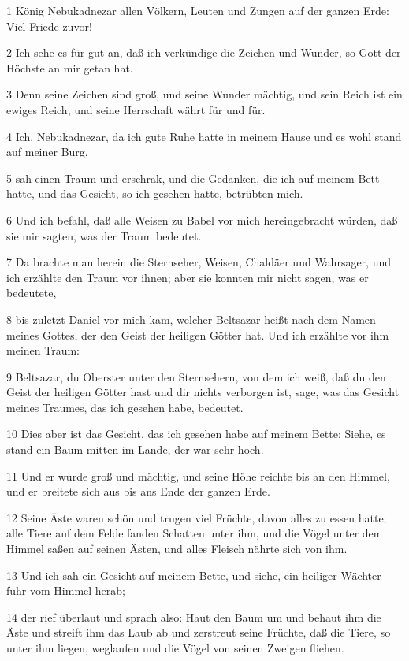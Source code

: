 \par 1 König Nebukadnezar allen Völkern, Leuten und Zungen auf der ganzen Erde: Viel Friede zuvor!
\par 2 Ich sehe es für gut an, daß ich verkündige die Zeichen und Wunder, so Gott der Höchste an mir getan hat.
\par 3 Denn seine Zeichen sind groß, und seine Wunder mächtig, und sein Reich ist ein ewiges Reich, und seine Herrschaft währt für und für.
\par 4 Ich, Nebukadnezar, da ich gute Ruhe hatte in meinem Hause und es wohl stand auf meiner Burg,
\par 5 sah einen Traum und erschrak, und die Gedanken, die ich auf meinem Bett hatte, und das Gesicht, so ich gesehen hatte, betrübten mich.
\par 6 Und ich befahl, daß alle Weisen zu Babel vor mich hereingebracht würden, daß sie mir sagten, was der Traum bedeutet.
\par 7 Da brachte man herein die Sternseher, Weisen, Chaldäer und Wahrsager, und ich erzählte den Traum vor ihnen; aber sie konnten mir nicht sagen, was er bedeutete,
\par 8 bis zuletzt Daniel vor mich kam, welcher Beltsazar heißt nach dem Namen meines Gottes, der den Geist der heiligen Götter hat. Und ich erzählte vor ihm meinen Traum:
\par 9 Beltsazar, du Oberster unter den Sternsehern, von dem ich weiß, daß du den Geist der heiligen Götter hast und dir nichts verborgen ist, sage, was das Gesicht meines Traumes, das ich gesehen habe, bedeutet.
\par 10 Dies aber ist das Gesicht, das ich gesehen habe auf meinem Bette: Siehe, es stand ein Baum mitten im Lande, der war sehr hoch.
\par 11 Und er wurde groß und mächtig, und seine Höhe reichte bis an den Himmel, und er breitete sich aus bis ans Ende der ganzen Erde.
\par 12 Seine Äste waren schön und trugen viel Früchte, davon alles zu essen hatte; alle Tiere auf dem Felde fanden Schatten unter ihm, und die Vögel unter dem Himmel saßen auf seinen Ästen, und alles Fleisch nährte sich von ihm.
\par 13 Und ich sah ein Gesicht auf meinem Bette, und siehe, ein heiliger Wächter fuhr vom Himmel herab;
\par 14 der rief überlaut und sprach also: Haut den Baum um und behaut ihm die Äste und streift ihm das Laub ab und zerstreut seine Früchte, daß die Tiere, so unter ihm liegen, weglaufen und die Vögel von seinen Zweigen fliehen.
